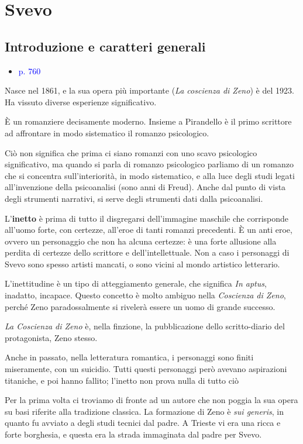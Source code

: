 \documentclass[a4paper, twoside, titlepage]{book}
\newcommand{\elenco}[1]{%
\begin{itemize}
#1
\end{itemize}}
\renewcommand{\emph}[1]{\textcolor{blue}{#1}}
\begin{document}
\part{Svevo}

\chapter{Introduzione e caratteri generali}

\elenco{\item \emph{p. 760}}

Nasce nel 1861, e la sua opera più importante (\textit{La coscienza di Zeno}) è del 1923.
Ha vissuto diverse esperienze significativo.

È un romanziere decisamente moderno. Insieme a Pirandello è il primo scrittore ad affrontare in modo sistematico il romanzo psicologico.

Ciò non significa che prima ci siano romanzi con uno scavo psicologico significativo, ma quando si parla di romanzo psicologico parliamo di un romanzo che si concentra sull'interiorità, in modo sistematico, e alla luce degli studi legati all'invenzione della psicoanalisi (sono anni di Freud). Anche dal punto di vista degli strumenti narrativi, si serve degli strumenti dati dalla psicoanalisi.

L'\textbf{inetto} è prima di tutto il disgregarsi dell'immagine maschile che corrisponde all'uomo forte, con certezze, all'eroe di tanti romanzi precedenti.
È un anti eroe, ovvero un personaggio che non ha alcuna certezze: è una forte allusione alla perdita di certezze dello scrittore e dell'intellettuale.
Non a caso i personaggi di Svevo sono spesso artisti mancati, o sono vicini al mondo artistico letterario.

L'inettitudine è un tipo di atteggiamento generale, che significa \textit{In aptus}, inadatto, incapace.
Questo concetto è molto ambiguo nella \textit{Coscienza di Zeno}, perché Zeno paradossalmente si rivelerà essere un uomo di grande successo.

\textit{La Coscienza di Zeno} è, nella finzione, la pubblicazione dello scritto-diario del protagonista, Zeno stesso.

Anche in passato, nella letteratura romantica, i personaggi sono finiti miseramente, con un suicidio. Tutti questi personaggi però avevano aspirazioni titaniche, e poi hanno fallito; l'inetto non prova nulla di tutto ciò

Per la prima volta ci troviamo di fronte ad un autore che non poggia la sua opera su basi riferite alla tradizione classica. La formazione di Zeno è \textit{sui generis}, in quanto fu avviato a degli studi tecnici dal padre.
A Trieste vi era una ricca e forte borghesia, e questa era la strada immaginata dal padre per Svevo.
\end{document}
